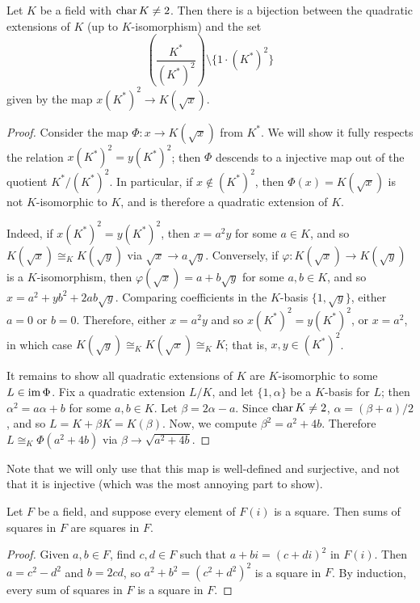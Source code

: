\begin{lemma}
  \label{lem:deg_2_classify}
  Let $K$ be a field with $\operatorname{char} K\neq2$. Then there is a bijection between the quadratic extensions of $K$ (up to $K$-isomorphism) and the set
  \[\left(\frac{K^*}{{(K^*)^2}}\right)\setminus\{1\cdot(K^*)^2\}\]
  given by the map $x(K^*)^2\to K(\sqrt{x})$.
\end{lemma}
\begin{proof}
  Consider the map $\Phi:x\to K(\sqrt{x})$ from $K^*$. We will show it fully respects the relation $x(K^*)^2=y(K^*)^2$; then $\Phi$ descends to a injective map out of the quotient $K^*/(K^*)^2$. In particular, if $x\notin(K^*)^2$, then $\Phi(x)=K(\sqrt{x})$ is not $K$-isomorphic to $K$, and is therefore a quadratic extension of $K$.

  Indeed, if $x(K^*)^2=y(K^*)^2$, then $x=a^2y$ for some $a\in K$, and so $K(\sqrt{x})\cong_K K(\sqrt{y})$ via $\sqrt{x}\to a\sqrt{y}$. Conversely, if $\varphi:K(\sqrt{x})\to K(\sqrt{y})$ is a $K$-isomorphism, then $\varphi(\sqrt{x})=a+b\sqrt{y}$ for some $a,b\in K$, and so $x=a^2+yb^2+2ab\sqrt{y}$. Comparing coefficients in the $K$-basis $\{1,\sqrt{y}\}$, either $a=0$ or $b=0$. Therefore, either $x=a^2y$ and so $x(K^*)^2=y(K^*)^2$, or $x=a^2$, in which case $K(\sqrt{y})\cong_K K(\sqrt{x})\cong_K K$; that is, $x,y\in(K^*)^2$.

  It remains to show all quadratic extensions of $K$ are $K$-isomorphic to some $L\in\operatorname{im}\Phi$. Fix a quadratic extension $L/K$, and let $\{1,\alpha\}$ be a $K$-basis for $L$; then $\alpha^2=a\alpha+b$ for some $a,b\in K$. Let $\beta=2\alpha-a$. Since $\operatorname{char} K\neq 2$, $\alpha=(\beta+a)/2$, and so $L=K+\beta K=K(\beta)$. Now, we compute $\beta^2=a^2+4b$. Therefore $L\cong_K\Phi(a^2+4b)$ via $\beta\to\sqrt{a^2+4b}$.
\end{proof}

Note that we will only use that this map is well-defined and surjective, and not that it is injective (which was the most annoying part to show).

\begin{lemma}
  \label{lem:sumsq_is_sq}
  Let $F$ be a field, and suppose every element of $F(i)$ is a square. Then sums of squares in $F$ are squares in $F$.
\end{lemma}
\begin{proof}
  Given $a,b\in F$, find $c,d\in F$ such that $a+bi=(c+di)^2$ in $F(i)$. Then $a=c^2-d^2$ and $b=2cd$, so $a^2+b^2=(c^2+d^2)^2$ is a square in $F$. By induction, every sum of squares in $F$ is a square in $F$.
\end{proof}

